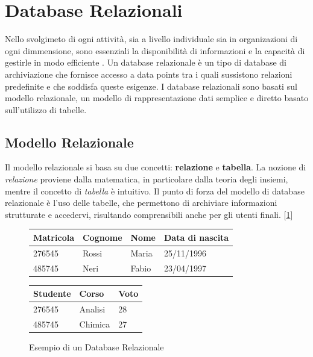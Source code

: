 \section{Database Relazionali}
Nello svolgimeto di ogni attività, sia a livello individuale sia in organizazioni di ogni dimmensione, sono essenziali la disponibilità di informazioni e la capacità di gestirle in modo efficiente \cite{book:basididati}. Un database relazionale è un tipo di database di archiviazione che fornisce accesso a data points tra i quali sussistono relazioni predefinite e che soddisfa queste esigenze. I database relazionali sono basati sul modello relazionale, un modello di rappresentazione dati semplice e diretto basato sull'utilizzo di tabelle.

\subsection{Modello Relazionale}
Il modello relazionale si basa su due concetti: \textbf{relazione} e \textbf{tabella}. La nozione di \textit{relazione} proviene dalla matematica, in particolare dalla teoria degli insiemi, mentre il concetto di \textit{tabella} è intuitivo. Il punto di forza del modello di database relazionale è l'uso delle tabelle, che permettono di archiviare informazioni strutturate e accedervi, risultando comprensibili anche per gli utenti finali. [\ref{fig:example-relationaldatabase}]
\begin{figure}
    \begin{table}[H]
        \centering
        \begin{tabular}{ |p{2cm}||p{2cm}|p{2cm}|p{3cm}|  }
            \hline
            Matricola & Cognome & Nome  & Data di nascita \\
            \hline
            276545    & Rossi   & Maria & 25/11/1996      \\
            485745    & Neri    & Fabio & 23/04/1997      \\
            \hline
        \end{tabular}
    \end{table}
    \begin{table}[H]
        \centering
        \begin{tabular}{ |p{2cm}||p{2cm}|p{2cm}|  }
            \hline
            Studente & Corso   & Voto \\
            \hline
            276545   & Analisi & 28   \\
            485745   & Chimica & 27   \\
            \hline
        \end{tabular}
    \end{table}
    \caption{Esempio di un Database Relazionale}
    \label{fig:example-relationaldatabase}
\end{figure}
